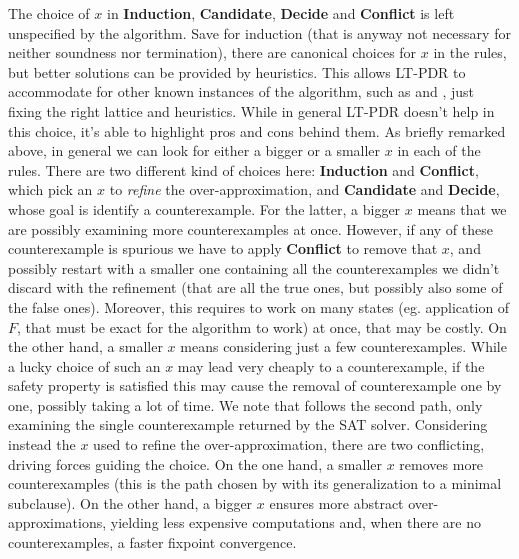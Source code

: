 The choice of $x$ in \textbf{Induction}, \textbf{Candidate}, \textbf{Decide} and \textbf{Conflict} is left unspecified by the algorithm. Save for induction (that is anyway not necessary for neither soundness nor termination), there are canonical choices for $x$ in the rules, but better solutions can be provided by heuristics. This allows LT-PDR to accommodate for other known instances of the algorithm, such as  and , just fixing the right lattice and heuristics.
While in general LT-PDR doesn't help in this choice, it's able to highlight pros and cons behind them. As briefly remarked above, in general we can look for either a bigger or a smaller $x$ in each of the rules. There are two different kind of choices here: \textbf{Induction} and \textbf{Conflict}, which pick an $x$ to \emph{refine} the over-approximation, and \textbf{Candidate} and \textbf{Decide}, whose goal is identify a counterexample.
For the latter, a bigger $x$ means that we are possibly examining more counterexamples at once. However, if any of these counterexample is spurious we have to apply \textbf{Conflict} to remove that $x$, and possibly restart with a smaller one containing all the counterexamples we didn't discard with the refinement (that are all the true ones, but possibly also some of the false ones). Moreover, this requires to work on many states (eg. application of $F$, that must be exact for the algorithm to work) at once, that may be costly. On the other hand, a smaller $x$ means considering just a few counterexamples. While a lucky choice of such an $x$ may lead very cheaply to a counterexample, if the safety property is satisfied this may cause the removal of counterexample one by one, possibly taking a lot of time. We note that  follows the second path, only examining the single counterexample returned by the SAT solver.
Considering instead the $x$ used to refine the over-approximation, there are two conflicting, driving forces guiding the choice. On the one hand, a smaller $x$ removes more counterexamples (this is the path chosen by  with its generalization to a minimal subclause). On the other hand, a bigger $x$ ensures more abstract over-approximations, yielding less expensive computations and, when there are no counterexamples, a faster fixpoint convergence.


